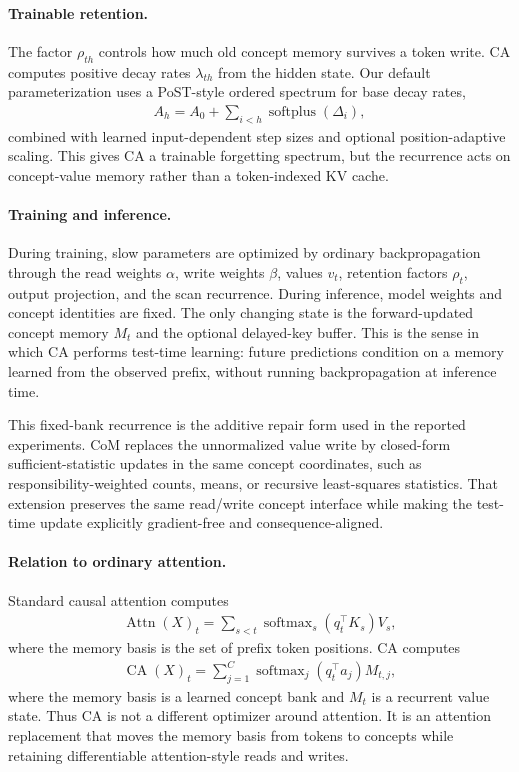 \paragraph{Trainable retention.}
The factor $\rho_{th}$ controls how much old concept memory survives a token write. CA computes positive decay rates $\lambda_{th}$ from the hidden state. Our default parameterization uses a PoST-style ordered spectrum for base decay rates,
\begin{align*}
A_h=A_0+\sum_{i<h}\operatorname{softplus}(\Delta_i),
\end{align*}
combined with learned input-dependent step sizes and optional position-adaptive scaling. This gives CA a trainable forgetting spectrum, but the recurrence acts on concept-value memory rather than a token-indexed KV cache.

\paragraph{Training and inference.}
During training, slow parameters are optimized by ordinary backpropagation through the read weights $\alpha$, write weights $\beta$, values $v_t$, retention factors $\rho_t$, output projection, and the scan recurrence. During inference, model weights and concept identities are fixed. The only changing state is the forward-updated concept memory $M_t$ and the optional delayed-key buffer. This is the sense in which CA performs test-time learning: future predictions condition on a memory learned from the observed prefix, without running backpropagation at inference time.

This fixed-bank recurrence is the additive repair form used in the reported experiments. CoM replaces the unnormalized value write by closed-form sufficient-statistic updates in the same concept coordinates, such as responsibility-weighted counts, means, or recursive least-squares statistics. That extension preserves the same read/write concept interface while making the test-time update explicitly gradient-free and consequence-aligned.

\paragraph{Relation to ordinary attention.}
Standard causal attention computes
\begin{align*}
\operatorname{Attn}(X)_t
=
\sum_{s<t}\operatorname{softmax}_s(q_t^\top K_s)V_s,
\end{align*}
where the memory basis is the set of prefix token positions. CA computes
\begin{align*}
\operatorname{CA}(X)_t
=
\sum_{j=1}^{C}\operatorname{softmax}_j(q_t^\top a_j)M_{t,j},
\end{align*}
where the memory basis is a learned concept bank and $M_t$ is a recurrent value state. Thus CA is not a different optimizer around attention. It is an attention replacement that moves the memory basis from tokens to concepts while retaining differentiable attention-style reads and writes.
